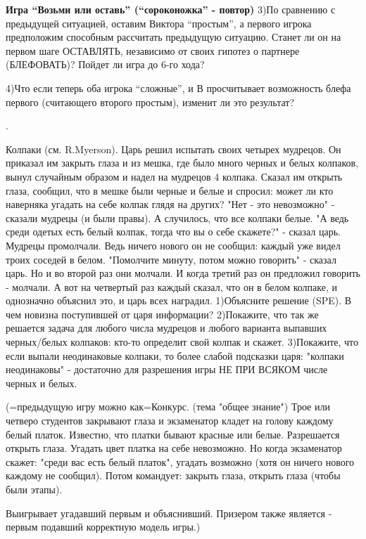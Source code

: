 \documentclass[a4paper,12pt]{article}
\begin{document}
\begin{exmp}{\bf Игра ``Возьми или оставь'' (``сороконожка'' - повтор)}
3)По сравнению с предыдущей ситуацией, оставим Виктора
``простым'', а первого игрока предположим способным
рассчитать предыдущую ситуацию. Станет ли он на первом шаге
ОСТАВЛЯТЬ, независимо от своих гипотез о партнере
(БЛЕФОВАТЬ)? Пойдет ли игра до 6-го хода?

4)Что если теперь оба игрока ``сложные'', и В просчитывает
возможность блефа первого (считающего второго простым),
изменит ли это результат?
\end{exmp}
.

\begin{exmp}
Колпаки (см. R.Myerson).\rm {} Царь решил испытать своих
четырех мудрецов. Он приказал им закрыть глаза и из мешка,
где было много черных и белых колпаков, вынул случайным
образом и надел на мудрецов 4 колпака. Сказал им открыть
глаза, сообщил, что в мешке были черные и белые и спросил:
может ли кто наверняка угадать на себе колпак глядя на
других? "Нет - это невозможно" - сказали мудрецы (и были
правы). А случилось, что все колпаки белые. "А ведь среди
одетых есть белый колпак, тогда что вы о себе скажете?" -
сказал царь. Мудрецы промолчали. Ведь ничего нового он не
сообщил: каждый уже видел троих соседей в белом. "Помолчите
минуту, потом можно говорить" - сказал царь. Но и во второй
раз они молчали. И когда третий раз он предложил говорить -
молчали. А вот на четвертый раз каждый сказал, что он в
белом колпаке, и однозначно объяснил это, и царь всех
наградил. 1)Объясните решение (SPE). В чем новизна
поступившей от царя информации? 2)Покажите, что так же
решается задача для любого числа мудрецов и любого варианта
выпавших черных/белых колпаков: кто-то определит свой
колпак и скажет. 3)Покажите, что если выпали неодинаковые
колпаки, то более слабой подсказки царя: "колпаки
неодинаковы" - достаточно для разрешения игры НЕ ПРИ ВСЯКОМ
числе черных и белых.

\end{exmp}

(=предыдущую игру можно как=Конкурс. (тема "общее
знание") Трое или четверо студентов закрывают глаза
и экзаменатор кладет на голову каждому белый
платок. Известно, что платки бывают красные или
белые. Разрешается открыть глаза. Угадать цвет
платка на себе невозможно. Но когда экзаменатор
скажет: "среди вас есть белый платок", угадать
возможно (хотя он ничего нового каждому не
сообщил). Потом командует: закрыть глаза, открыть
глаза (чтобы были этапы).

Выигрывает угадавший первым и объяснивший. Призером
также является - первым подавший корректную модель
игры.)
\end{document}

